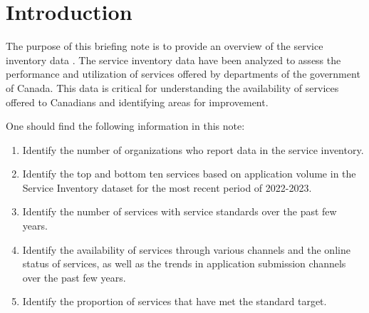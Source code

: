 \section{Introduction}

The purpose of this briefing note is to provide an overview of the service inventory data \cite{cite1}. The service inventory data have been analyzed to assess the performance and utilization of services offered by departments of the government of Canada. This data is critical for understanding the availability of services offered to Canadians and identifying areas for improvement.

One should find the following information in this note: 
\begin{tcolorbox}[title=Key Findings,boxrule=1pt]
    \begin{enumerate}
        \item Identify the number of organizations who report data in the service inventory.

        \item Identify the top and bottom ten services based on application volume in the Service Inventory dataset for the most recent period of 2022-2023.

        \item Identify the number of services with service standards over the past few years.

        \item Identify the availability of services through various channels and the online status of services, as well as the trends in application submission channels over the past few years.

        \item Identify the proportion of services that have met the standard target.
    \end{enumerate}
\end{tcolorbox}